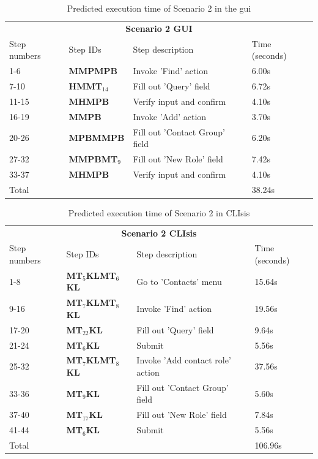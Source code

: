 \begin{table}[H]
	\center
	
	\begin{tabular}{llll}
		\toprule
		\multicolumn{4}{c}{\textbf{Scenario 2 GUI}} \\
		\addlinespace[0.5em]
		Step numbers & Step IDs & Step description & Time (seconds) \\
		\midrule
		1-6 		& \textbf{MMPMPB} 				& Invoke 'Find' action 				& 6.00s \\
		7-10		& \textbf{HMMT$_{14}$} 		& Fill out 'Query' field		 		& 6.72s \\
		11-15	& \textbf{MHMPB}					& Verify input and confirm		& 4.10s \\
		16-19	& \textbf{MMPB}						& Invoke 'Add' action				& 3.70s \\
		20-26	& \textbf{MPBMMPB}				& Fill out 'Contact Group' field	& 6.20s \\
		27-32	& \textbf{MMPBMT$_9$}		& Fill out 'New Role' field			& 7.42s \\
		33-37	& \textbf{MHMPB}					& Verify input and confirm		& 4.10s \\
		\midrule
		\multicolumn{3}{l}{Total}																	& 38.24s\\
		\bottomrule
	\end{tabular}
	
	\caption{Predicted execution time of Scenario 2 in the \acrshort{gui}}
	\label{table:gomsscenario2gui}
\end{table}

\begin{table}[H]
	\center
	
	\begin{tabular}{llll}
		\toprule
		\multicolumn{4}{c}{\textbf{Scenario 2 CLIsis}} \\
		\addlinespace[0.5em]
		Step numbers & Step IDs & Step description & Time (seconds) \\
		\midrule
		1-8 		& \textbf{MT$_5$KLMT$_6$KL}	& Go to 'Contacts' menu 					& 15.64s \\
		9-16		& \textbf{MT$_7$KLMT$_8$KL}	& Invoke 'Find' action						& 19.56s \\
		17-20	& \textbf{MT$_{22}$KL}				& Fill out 'Query' field						& 9.64s \\
		21-24	& \textbf{MT$_6$KL}						& Submit											& 5.56s \\
		25-32	& \textbf{MT$_7$KLMT$_8$KL}	& Invoke 'Add contact role' action	& 37.56s \\
		33-36	& \textbf{MT$_9$KL}						& Fill out 'Contact Group' field			& 5.60s \\
		37-40	& \textbf{MT$_{17}$KL}				& Fill out 'New Role' field					& 7.84s \\
		41-44	& \textbf{MT$_6$KL}						& Submit											& 5.56s \\
		\midrule
		\multicolumn{3}{l}{Total}																					& 106.96s\\
		\bottomrule
	\end{tabular}
	
	\caption{Predicted execution time of Scenario 2 in CLIsis}
	\label{table:gomsscenario2clisis}
\end{table}

